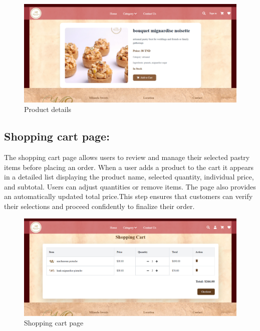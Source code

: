 \begin{figure}[!h]
\begin{center}
\includegraphics{images/product details.png}
\end{center}
\caption{Product details}
\end{figure}

\subsection{Shopping cart page:}

The shopping cart page allows users to review and manage their selected pastry items before placing an order. When a user adds a product to the cart it appears in a detailed list displaying the product name, selected quantity, individual price, and subtotal. Users can adjust quantities or remove items. The page also provides an automatically updated total price.This step ensures that customers can verify their selections and proceed confidently to finalize their order.

\begin{figure}[!h]
\begin{center}
\includegraphics{images/Shopping cart page.png}
\end{center}
\caption{Shopping cart page}
\end{figure}

